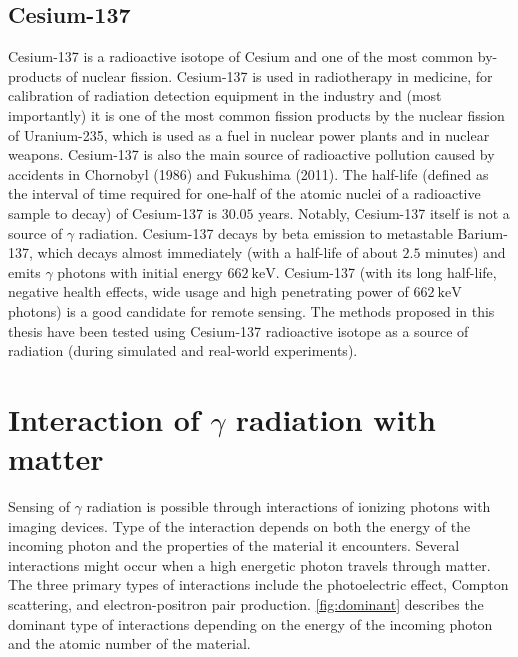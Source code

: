 \subsection{Cesium-137}
Cesium-137 is a radioactive isotope of Cesium and one of the most common by-products of nuclear fission.
Cesium-137 is used in radiotherapy in medicine, for calibration of radiation detection equipment in the industry and 
(most importantly) it is one of the most common fission products by the nuclear fission of Uranium-235, which is used as a fuel in nuclear power plants and in nuclear weapons.
Cesium-137 is also the main source of radioactive pollution caused by accidents in Chornobyl (1986) and Fukushima (2011).
The half-life (defined as the interval of time required for one-half of the atomic nuclei of a radioactive sample to decay) of Cesium-137 is $30.05$ years.
Notably, Cesium-137 itself is not a source of $\gamma$ radiation.
Cesium-137 decays by beta emission to metastable Barium-137, which decays almost immediately (with a half-life of about $2.5$ minutes) and emits $\gamma$ photons with initial energy $\SI{662}{\kilo\electronvolt}$.
Cesium-137 (with its long half-life, negative health effects, wide usage and high penetrating power of $\SI{662}{\kilo\electronvolt}$ photons) is a good candidate for remote sensing. 
The methods proposed in this thesis have been tested using Cesium-137 radioactive isotope as a source of radiation (during simulated and real-world experiments).

\section{Interaction of $\gamma$ radiation with matter}
Sensing of $\gamma$ radiation is possible through interactions of ionizing photons with imaging devices.
Type of the interaction depends on both the energy of the incoming photon and the properties of the material it encounters. 
Several interactions might occur when a high energetic photon travels through matter.
The three primary types of interactions include the photoelectric effect, Compton scattering, and electron-positron pair production.
\autoref{fig:dominant} describes the dominant type of interactions depending on the energy of the incoming photon and the atomic number of the material.

